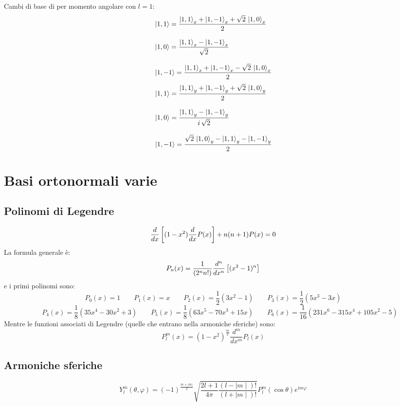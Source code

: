 %
%
Cambi di base di per momento angolare con $l = 1$:
\begin{subequations}
	\label{spin1:scomp_xz}
	\begin{align}
		&\left| 1,1 \right> = \frac{\left| 1,1 \right>_x + \left| 1,-1 \right>_x + \sqrt{2}\,\left| 1,0 \right>_x}{2}\\[2ex]
		&\left| 1,0 \right> = \frac{\left| 1,1 \right>_x - \left| 1,-1 \right>_x}{\sqrt{2}}\\[2ex]
		&\left| 1,-1 \right> = \frac{\left| 1,1 \right>_x + \left| 1,-1 \right>_x - \sqrt{2}\,\left| 1,0 \right>_x}{2}
	\end{align}
\end{subequations}
\begin{subequations}
	\label{spin1:scomp_yz}
	\begin{align}
		&\left| 1,1 \right> = \frac{\left| 1,1 \right>_y + \left| 1,-1 \right>_y + \sqrt{2}\,\left| 1,0 \right>_y}{2}\\[2ex]
		&\left| 1,0 \right> = \frac{\left| 1,1 \right>_y - \left| 1,-1 \right>_y}{i\,\sqrt{2}}\\[2ex]
		&\left| 1,-1 \right>= \frac{\sqrt{2}\,\left| 1,0 \right>_y - \left| 1,1 \right>_y - \left| 1,-1 \right>_y}{2}
	\end{align}
\end{subequations}
\section{Basi ortonormali varie}
\subsection{Polinomi di Legendre}
$$
{d \over dx} \left[ (1-x^2) {d \over dx} P(x) \right] + n(n+1)P(x) = 0
$$
La formula generale è:
$$
P_n(x) = \frac{1}{(2^n n!)}{d^n \over dx^n } \left[ (x^2-1)^n \right] 
$$
e i primi polinomi sono:
$$
	P_0(x)=1 \qquad	P_1(x)=x	 \qquad 	P_2(x) = \frac{1}{2}(3x^2 - 1)		\qquad P_3(x) = \frac{1}{2}(5x^3 - 3x)
$$
$$
	\qquad P_4(x) = \frac{1}{8}(35x^4 - 30x^2 + 3) \qquad P_5(x) = \frac{1}{8}(63x^5 - 70x^3 + 15x)
	\qquad P_6(x) = \frac{1}{16}(231x^6 - 315x^4 + 105x^2 - 5)
$$
Mentre le funzioni associati di Legendre (quelle che entrano nella armoniche sferiche) sono:
$$
P_{l}^m (x) = (1-x^2)^{\frac{m}{2}}\frac{d^m}{dx^m} P_l (x)
$$
\subsection{Armoniche sferiche}

$$
 Y^m_l (\theta,\varphi)= {(-1)^{\frac{m+|m|}{2}}} \sqrt{ \frac{2l+1}{4\pi}
\frac{(l-\mid m \mid)!}{(l+\mid m \mid)!} }
P^{ m}_l(\cos\theta) e^{im\varphi} 
$$


